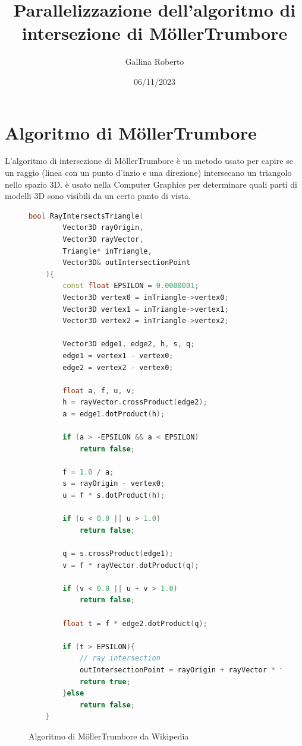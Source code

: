 \documentclass[a4paper]{article}
\begin{document}
\title{Parallelizzazione dell'algoritmo di intersezione di Möller\-Trumbore}
\author{Gallina Roberto}
\date{06/11/2023}

\maketitle

\newpage

\tableofcontents

\newpage

\section{Algoritmo di Möller\-Trumbore}
L'algoritmo di intersezione di Möller\-Trumbore è un metodo usato per capire se un raggio (linea con un punto d'inzio e una direzione) intersecano un triangolo nello spazio 3D.
è usato nella Computer Graphics per determinare quali parti di modelli 3D sono visibili da un certo punto di vista.

\begin{figure}[htp]
    \begin{lstlisting}[language=c++]
    bool RayIntersectsTriangle(
        Vector3D rayOrigin, 
        Vector3D rayVector, 
        Triangle* inTriangle,
        Vector3D& outIntersectionPoint
    ){
        const float EPSILON = 0.0000001;
        Vector3D vertex0 = inTriangle->vertex0;
        Vector3D vertex1 = inTriangle->vertex1;  
        Vector3D vertex2 = inTriangle->vertex2;
        
        Vector3D edge1, edge2, h, s, q;
        edge1 = vertex1 - vertex0;
        edge2 = vertex2 - vertex0;
        
        float a, f, u, v;
        h = rayVector.crossProduct(edge2);
        a = edge1.dotProduct(h);
        
        if (a > -EPSILON && a < EPSILON)
            return false;
        
        f = 1.0 / a;
        s = rayOrigin - vertex0;
        u = f * s.dotProduct(h);
        
        if (u < 0.0 || u > 1.0)
            return false;
            
        q = s.crossProduct(edge1);
        v = f * rayVector.dotProduct(q);
            
        if (v < 0.0 || u + v > 1.0)
            return false;
        
        float t = f * edge2.dotProduct(q);
        
        if (t > EPSILON){
            // ray intersection
            outIntersectionPoint = rayOrigin + rayVector * t;
            return true;
        }else
            return false;
    }
    \end{lstlisting}
    \caption{Algoritmo di Möller\-Trumbore da Wikipedia}
\end{figure}
\end{document}
